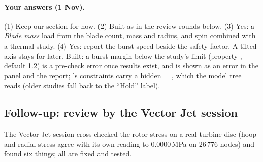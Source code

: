 \paragraph{Your answers (1 Nov).} (1) Keep our section for now. (2) Built as  in the review rounds
below. (3) Yes: a \emph{Blade mass} load from the blade count, mass and radius, and spin combined with a thermal study.
(4) Yes: report the burst speed beside the safety factor. A tilted-axis  stays for later. Built: a burst margin below the study's limit (property , default 1.2) is a pre-check error once results exist, and is shown as an error in the panel and the report; 's constraints carry a hidden  = , which the model tree reads (older studies fall back to the ``Hold'' label).


\subsection*{Follow-up: review by the Vector Jet session}

The Vector Jet session cross-checked the rotor stress on a real turbine disc (hoop and radial stress agree with its own
reading to 0.0000\,MPa on 26\,776 nodes) and found six things; all are fixed and tested.

